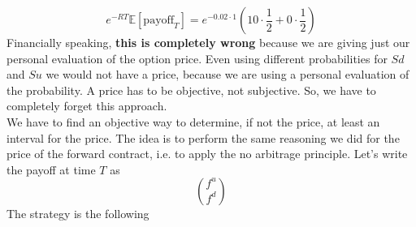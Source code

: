 \begin{equation*}
    e^{-RT}\mathbb{E}[\mbox{payoff}_T] = e^{-0.02\cdot1}\left(10\cdot\dfrac{1}{2} + 0\cdot\dfrac{1}{2}\right) 
\end{equation*}
Financially speaking, \textbf{this is completely wrong} because we are giving just our personal evaluation of the option price. Even using different probabilities for $Sd$ and $Su$ we would not have a price, because we are using a personal evaluation of the probability. A price has to be objective, not subjective. So, we have to completely forget this approach.\\
We have to find an objective way to determine, if not the price, at least an interval for the price. The idea is to perform the same reasoning we did for the price of the forward contract, i.e. to apply the no arbitrage principle. Let's write the payoff at time $T$ as 
\begin{equation*}
    \binom{f^u}{f^d}
\end{equation*}
The strategy is the following 
